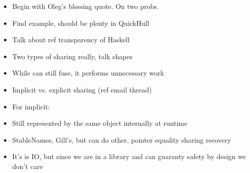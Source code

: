 \documentclass[preamble.tex]{subfiles}
\begin{document}
\begin{itemize}
\item Begin with Oleg's blessing quote. On two probs.
\item Find example, should be plenty in QuickHull
\item Talk about ref transparency of Haskell
\item Two types of sharing really, talk shapes
\item While can still fuse, it performs unnecessary work
\item Implicit vs. explicit sharing (ref email thread)
\item For implicit:
\item Still represented by the same object internally at runtime
\item StableNames, Gill's, but can do other, pointer equality sharing recovery
\item It's is IO, but since we are in a library and can guaranty safety by design we don't care
\end{itemize}
\end{document}
